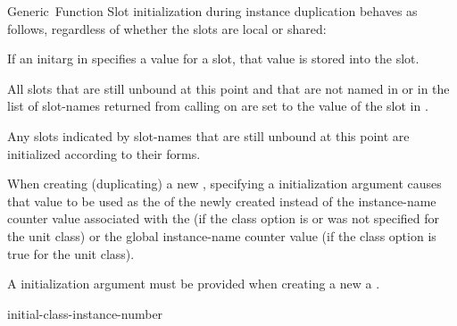 \documentclass[10pt,twoside,english,pdftex]{article}
\begin{document}
\begin{functiondoc}{Generic~Function}
%
%
%
\fndescription 
%
Slot initialization during instance duplication behaves as follows, regardless
of whether the slots are local or shared:
%
\begin{tightitemize}
\item If an initarg in  specifies a value for a slot, that
  value is stored into the slot.
\item All slots that are still unbound at this point and that are not named in
   or in the list of slot-names returned from
  calling  on
   are set to the value of the slot in .
\item Any slots indicated by slot-names that are still unbound at this point
  are initialized according to their  forms. 
\end{tightitemize}

When creating (duplicating) a new , specifying a
 initialization argument causes that value to be
used as the  of the newly created 
instead of the instance-name counter value associated with the
 (if the 
class option is \nil{} or was not specified for the unit class) or the global
instance-name counter value (if the
 class option is true for the
unit class).

A  initialization argument must be provided when
creating a new a .

\begin{alsos}{initial-class-instance-number}
\end{alsos}


\end{functiondoc}
\end{document}
